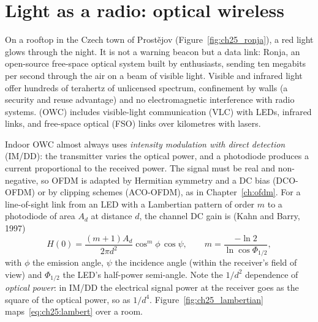 
\section{Light as a radio: optical wireless}
\label{sec:ch25:owc}

On a rooftop in the Czech town of Prost\v{e}jov (Figure~\ref{fig:ch25_ronja}), a red light glows
through the night. It is not a warning beacon but a data link: Ronja, an open-source free-space
optical system built by enthusiasts, sending ten megabits per second through the air on a beam of
visible light. Visible and infrared light offer hundreds of terahertz of unlicensed spectrum,
confinement by walls (a security and reuse advantage) and no electromagnetic interference with radio
systems.  (OWC) includes visible-light communication (VLC) with
LEDs, infrared links, and free-space optical (FSO) links over kilometres with lasers.


Indoor OWC almost always uses \emph{intensity modulation with direct detection} (IM/DD): the
transmitter varies the optical power, and a photodiode produces a current proportional to the received
power. The signal must be real and non-negative, so OFDM is adapted by Hermitian symmetry and a DC bias
(DCO-OFDM) or by clipping schemes (ACO-OFDM), as in Chapter~\ref{ch:ofdm}. For a line-of-sight link from
an LED with a Lambertian pattern of order $m$ to a photodiode of area $A_d$ at distance $d$, the channel
DC gain is (Kahn and Barry, 1997)
\begin{equation}
H(0)=\frac{(m+1)A_d}{2\pi d^2}\cos^m\phi\,\cos\psi,\qquad m=\frac{-\ln2}{\ln\cos\Phi_{1/2}},
\label{eq:ch25:lambert}
\end{equation}
with $\phi$ the emission angle, $\psi$ the incidence angle (within the receiver's field of view) and
$\Phi_{1/2}$ the LED's half-power semi-angle. Note the $1/d^2$ dependence of \emph{optical power}: in
IM/DD the electrical signal power at the receiver goes as the square of the optical power, so as
$1/d^4$. Figure~\ref{fig:ch25_lambertian} maps~\eqref{eq:ch25:lambert} over a room.

